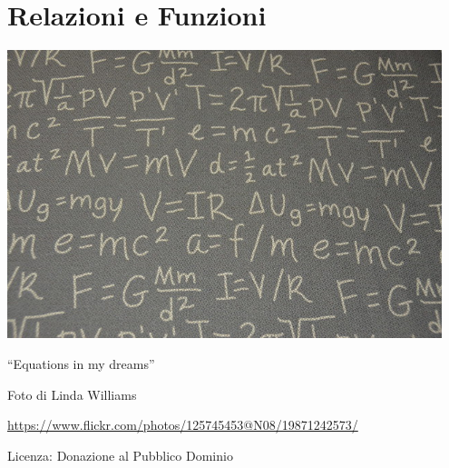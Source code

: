 \part{Relazioni e Funzioni}

\includegraphics[width=0.95\textwidth]{img/equation.jpg}
  \begin{center}
    {\large ``Equations in my dreams''}\par
    Foto di Linda Williams\par %
    \url{https://www.flickr.com/photos/125745453@N08/19871242573/}\par
    Licenza: Donazione al Pubblico Dominio\par
  \end{center}
\clearpage
\cleardoublepage
